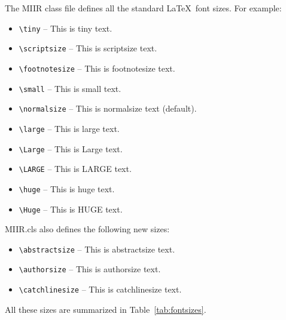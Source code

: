 \documentclass{MIIR}
\theoremstyle{plain}
\theoremstyle{definition}
\begin{document}
The MIIR class file defines all the standard \LaTeX\ font sizes. For example:
\begin{itemize}
  \item \verb"\tiny" -- {\tiny This is tiny text.}
  \item \verb"\scriptsize" -- {\scriptsize This is scriptsize text.}
  \item \verb"\footnotesize" -- {\footnotesize This is footnotesize text.}
  \item \verb"\small" -- {\small This is small text.}
  \item \verb"\normalsize" -- This is normalsize text (default).
  \item \verb"\large" -- {\large This is large text.}
  \item \verb"\Large" -- {\Large This is Large text.}
  \item \verb"\LARGE" -- {\LARGE This is LARGE text.}
  \item \verb"\huge" -- {\huge This is huge text.}
  \item \verb"\Huge" -- {\Huge This is HUGE text.}
\end{itemize}
%
MIIR.cls also defines the following new sizes:
\begin{itemize}
  \item \verb"\abstractsize" -- {\abstractsize This is abstractsize text.}
  \item \verb"\authorsize" -- {\authorsize This is authorsize text.}
  \item \verb"\catchlinesize" -- {\catchlinesize This is catchlinesize text.}
\end{itemize}
%
All these sizes are summarized in Table~\ref{tab:fontsizes}.
%
\end{document}
